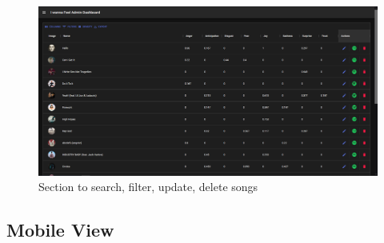 \begin{figure}[H]
\centering
\includegraphics[width=\textwidth]{imgs/data_collection_2.png}
\caption{Section to search, filter, update, delete songs}
\label{fig: data_collection_2}
\end{figure}

\subsection{Mobile View}

